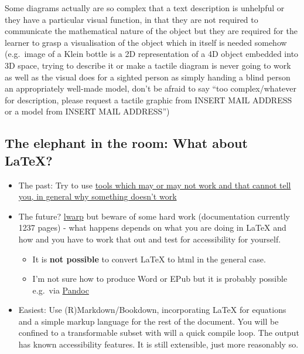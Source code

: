 \documentclass[
  10pt,
  english,
  a4paper]{article}
\providecommand{\tightlist}{%
  \setlength{\itemsep}{0pt}\setlength{\parskip}{0pt}}
\theoremstyle{plain}
\theoremstyle{plain}
\theoremstyle{plain}
\theoremstyle{plain}
\theoremstyle{plain}
\theoremstyle{definition}
\theoremstyle{definition}
\theoremstyle{definition}
\theoremstyle{remark}
\begin{document}
Some diagrams actually are so complex that a text description is unhelpful or they have a particular visual function, in that they are not required to communicate the mathematical nature of the object but they are required for the learner to grasp a visualisation of the object which in itself is needed somehow (e.g.~image of a Klein bottle is a 2D representation of a 4D object embedded into 3D space, trying to describe it or make a tactile diagram is never going to work as well as the visual does for a sighted person as simply handing a blind person an appropriately well-made model, don't be afraid to say ``too complex/whatever for description, please request a tactile graphic from INSERT MAIL ADDRESS or a model from INSERT MAIL ADDRESS'')

\hypertarget{the-elephant-in-the-room-what-about-latex}{%
\subsection{The elephant in the room: What about LaTeX?}\label{the-elephant-in-the-room-what-about-latex}}

\begin{itemize}
\tightlist
\item
  The past: Try to use \href{https://hub.docker.com/r/bathmash/mathaltnotes}{tools which may or may not work and that cannot tell you, in general why something doesn't work}
\item
  The future? \href{https://ctan.org/pkg/lwarp?lang=en}{lwarp} but beware of some hard work (documentation currently 1237 pages) - what happens depends on what you are doing in LaTeX and how and you have to work that out and test for accessibility for yourself.

  \begin{itemize}
  \tightlist
  \item
    It is \textbf{not possible} to convert LaTeX to html in the general case.
  \item
    I'm not sure how to produce Word or EPub but it is probably possible e.g.~via \href{https://pandoc.org/}{Pandoc}
  \end{itemize}
\item
  Easiest: Use (R)Markdown/Bookdown, incorporating LaTeX for equations and a simple markup language for the rest of the document. You will be confined to a transformable subset with will a quick compile loop. The output has known accessibility features. It is still extensible, just more reasonably so.
\end{itemize}
\end{document}

